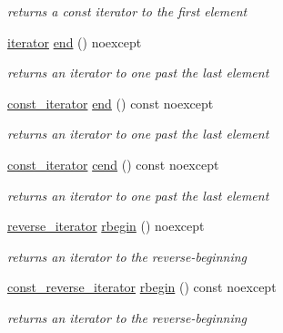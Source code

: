 \begin{DoxyCompactItemize}
\begin{DoxyCompactList}\small\item\em returns a const iterator to the first element \end{DoxyCompactList}\item 
\hyperlink{classnlohmann_1_1basic__json_aa549b2b382916b3baafb526e5cb410bd}{iterator} \hyperlink{classnlohmann_1_1basic__json_a931267ec3f09eb67e4382f321b2c52bc}{end} () noexcept
\begin{DoxyCompactList}\small\item\em returns an iterator to one past the last element \end{DoxyCompactList}\item 
\hyperlink{classnlohmann_1_1basic__json_aebd2cfa7e4ded4e97cde9269bfeeea38}{const\+\_\+iterator} \hyperlink{classnlohmann_1_1basic__json_a82b5b96f86879a3bac0c713d33178551}{end} () const noexcept
\begin{DoxyCompactList}\small\item\em returns an iterator to one past the last element \end{DoxyCompactList}\item 
\hyperlink{classnlohmann_1_1basic__json_aebd2cfa7e4ded4e97cde9269bfeeea38}{const\+\_\+iterator} \hyperlink{classnlohmann_1_1basic__json_a3017cf0f1a4673e904e34cfef62e7758}{cend} () const noexcept
\begin{DoxyCompactList}\small\item\em returns an iterator to one past the last element \end{DoxyCompactList}\item 
\hyperlink{classnlohmann_1_1basic__json_a5b8c0ebedd920b507f4f7ff4e19bf3c6}{reverse\+\_\+iterator} \hyperlink{classnlohmann_1_1basic__json_aff8e38cd973bc94557fa8d36433c0e4c}{rbegin} () noexcept
\begin{DoxyCompactList}\small\item\em returns an iterator to the reverse-\/beginning \end{DoxyCompactList}\item 
\hyperlink{classnlohmann_1_1basic__json_aa7dba16ed9ee97380aeb17a207dd919a}{const\+\_\+reverse\+\_\+iterator} \hyperlink{classnlohmann_1_1basic__json_aab1329f44c8301b7679962726a043549}{rbegin} () const noexcept
\begin{DoxyCompactList}\small\item\em returns an iterator to the reverse-\/beginning \end{DoxyCompactList}\item 

\end{DoxyCompactItemize}
